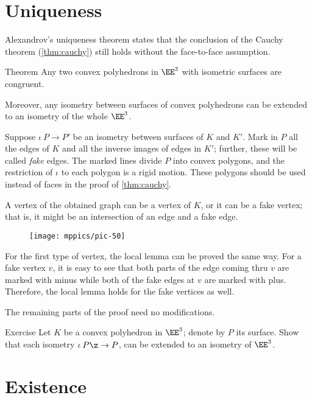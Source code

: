  \section{Uniqueness}

Alexandrov's uniqueness theorem states that the conclusion of the Cauchy theorem (\ref{thm:cauchy}) still holds without the face-to-face assumption.

\begin{thm}{Theorem}\label{thm:alexandrov-uni'}
Any two convex polyhedrons in $\EE^3$ with isometric surfaces are congruent.

Moreover, any isometry between surfaces of convex polyhedrons can be extended to an isometry of the whole $\EE^3$.
\end{thm}

Suppose $\iota\:P\to P'$ be an isometry between surfaces of $K$ and $K'$.
Mark in $P$ all the edges of $K$ and all the inverse images of edges in $K'$; further, these will be called \emph{fake} edges.
The marked lines divide $P$ into convex polygons, and the restriction of $\iota$ to each polygon is a rigid motion.
These polygons should be used instead of faces in the proof of \ref{thm:cauchy}.

A vertex of the obtained graph can be a vertex of $K$, or it can be a fake vertex;
that is, it might be an intersection of an edge and a fake edge.

\begin{figure}[ht!]
\vskip-0mm
\centering
\texttt{[image: mppics/pic-50]}
\vskip-0mm
\end{figure}

For the first type of vertex, the local lemma can be proved the same way.
For a fake vertex $v$, it is easy to see that both parts of the edge coming thru $v$ are marked with minus
while both of the fake edges at $v$ are marked with plus.
Therefore, the local lemma holds for the fake vertices as well.

The remaining parts of the proof need no modifications.
\qeds

\begin{thm}{Exercise}\label{pr:K-P-simmetry}
Let $K$ be a convex polyhedron in $\EE^3$;
denote by $P$ its surface.
Show that each isometry $\iota\:P\z\to P$,
can be extended to an isometry of $\EE^3$.
\end{thm}

\section{Existence}\label{sec:Alexandrov-existence}

